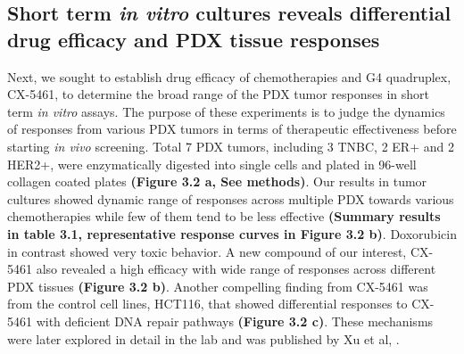 \subsection{Short term \textit {in vitro} cultures reveals differential drug efficacy and PDX tissue responses
}
Next, we sought to establish drug efficacy of chemotherapies and G4 quadruplex, CX-5461, to determine the broad range of the PDX tumor responses in short term \textit{in vitro} assays. The purpose of these experiments is to judge the dynamics of responses from various PDX tumors in terms of therapeutic effectiveness before starting \textit{in vivo} screening. Total 7 PDX tumors, including 3 TNBC, 2 ER+ and 2 HER2+, were enzymatically digested into single cells and plated in 96-well collagen coated plates  \textbf {(Figure 3.2 a, See methods)}. 
Our results in tumor cultures showed dynamic range of responses across multiple PDX towards various chemotherapies while few of them tend to be less effective \textbf{(Summary results in table 3.1, representative response curves in Figure 3.2 b)}. Doxorubicin in contrast showed very toxic behavior. A new compound of our interest, CX-5461 also revealed a high efficacy with wide range of responses across different PDX tissues \textbf{(Figure 3.2 b)}. Another compelling finding from CX-5461 was from the control cell lines, HCT116, that showed differential responses to CX-5461 with deficient DNA repair pathways \textbf{(Figure 3.2 c)}. These mechanisms were later explored in detail in the lab and was published by Xu et al, \cite{xu2017cx}. 


